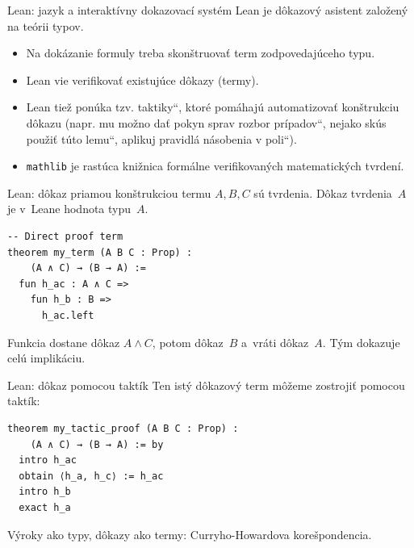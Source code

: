 \documentclass[12pt]{beamer}
\providecommand{\uv}[1]{\quotedblbase #1\textquotedblleft}
\begin{document}
\begin{frame}{Lean: jazyk a interaktívny dokazovací systém}
Lean je dôkazový asistent založený na teórii typov.
\begin{itemize}
    \item Na dokázanie formuly treba skonštruovať term zodpovedajúceho typu.
    \item Lean vie verifikovať existujúce dôkazy (termy).
    \item Lean tiež ponúka tzv. \uv{taktiky}, ktoré pomáhajú automatizovať konštrukciu dôkazu
      (napr. mu možno dať pokyn \uv{sprav rozbor prípadov}, \uv{nejako skús použiť túto lemu},
      \uv{aplikuj pravidlá násobenia v poli}).
    \item \texttt{mathlib} je rastúca knižnica formálne verifikovaných matematických tvrdení.
\end{itemize}
\end{frame}

\begin{frame}[fragile]{Lean: dôkaz priamou konštrukciou termu}
$A,B,C$ sú tvrdenia. Dôkaz tvrdenia~$A$ je v~Leane hodnota typu~$A$.
\begin{lstlisting}[language=Lean,basicstyle=\footnotesize\ttfamily]
-- Direct proof term
theorem my_term (A B C : Prop) :
    (A ∧ C) → (B → A) :=
  fun h_ac : A ∧ C =>
    fun h_b : B =>
      h_ac.left
\end{lstlisting}
Funkcia dostane dôkaz $A\land C$, potom dôkaz~$B$
a~vráti dôkaz~$A$. Tým dokazuje celú implikáciu.
\end{frame}

\begin{frame}[fragile]{Lean: dôkaz pomocou taktík}
Ten istý dôkazový term môžeme zostrojiť pomocou taktík:
\begin{lstlisting}[language=Lean,basicstyle=\footnotesize\ttfamily]
theorem my_tactic_proof (A B C : Prop) :
    (A ∧ C) → (B → A) := by
  intro h_ac
  obtain ⟨h_a, h_c⟩ := h_ac
  intro h_b
  exact h_a
\end{lstlisting}
{\small Výroky ako typy, dôkazy ako termy: Curryho-Howardova korešpondencia.}
\end{frame}
\end{document}
